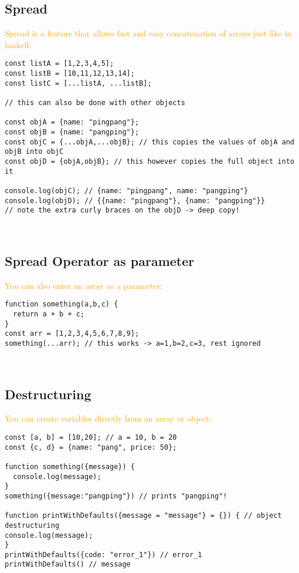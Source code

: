 \documentclass[main.tex,fontsize=6pt,paper=a4,paper=landscape,DIV=calc,]{scrartcl}
\begin{document}
\begin{multicols*}{4}
\subsection{Spread}  
\textcolor{orange}{Spread is a feature that allows fast and easy concatenation of arrays just like in haskell:}
\begin{lstlisting}
const listA = [1,2,3,4,5];
const listB = [10,11,12,13,14];
const listC = [...listA, ...listB];

// this can also be done with other objects

const objA = {name: "pingpang"};
const objB = {name: "pangping"};
const objC = {...objA,...objB}; // this copies the values of objA and objB into objC
const objD = {objA,objB}; // this however copies the full object into it

console.log(objC); // {name: "pingpang", name: "pangping"}
console.log(objD); // {{name: "pingpang"}, {name: "pangping"}}
// note the extra curly braces on the objD -> deep copy!
\end{lstlisting}
\, \newline

\subsection{Spread Operator as parameter}  
\textcolor{orange}{You can also enter an array as a parameter:}
\begin{lstlisting}
function something(a,b,c) {
  return a + b + c;
}
const arr = [1,2,3,4,5,6,7,8,9];
something(...arr); // this works -> a=1,b=2,c=3, rest ignored
\end{lstlisting}
\, \newline

\subsection{Destructuring}  
\textcolor{orange}{You can create variables directly from an array or object:}
\begin{lstlisting}
const [a, b] = [10,20]; // a = 10, b = 20 
const {c, d} = {name: "pang", price: 50};

function something({message}) {
  console.log(message);
}
something({message:"pangping"}) // prints "pangping"!

function printWithDefaults({message = "message"} = {}) { // object destructuring
console.log(message);
}
printWithDefaults({code: "error_1"}) // error_1
printWithDefaults() // message
\end{lstlisting}
\, \newline


\end{multicols*}
\end{document}
